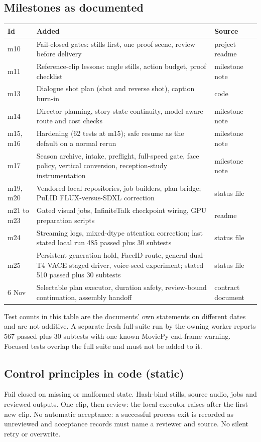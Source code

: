 \documentclass[11pt,a4paper]{article}
\begin{document}
\subsection{Milestones as documented}
\begin{longtable}{@{}P{1.6cm}P{9.9cm}P{4.0cm}@{}}
\toprule \textbf{Id} & \textbf{Added} & \textbf{Source}\\ \midrule\endhead
m10 & Fail-closed gates: stills first, one proof scene, review before delivery & project readme\\
m11 & Reference-clip lessons: angle stills, action budget, proof checklist & milestone note\\
m13 & Dialogue shot plan (shot and reverse shot), caption burn-in & code\\
m14 & Director planning, story-state continuity, model-aware route and cost checks & milestone note\\
m15, m16 & Hardening (62 tests at m15); safe resume as the default on a normal rerun & milestone note\\
m17 & Season archive, intake, preflight, full-speed gate, face policy, vertical conversion, reception-study instrumentation & milestone note\\
m19, m20 & Vendored local repositories, job builders, plan bridge; PuLID FLUX-versus-SDXL correction & status file\\
m21 to m23 & Gated visual jobs, InfiniteTalk checkpoint wiring, GPU preparation scripts & readme\\
m24 & Streaming logs, mixed-dtype attention correction; last stated local run 485 passed plus 30 subtests & status file\\
m25 & Persistent generation hold, FaceID route, general dual-T4 VACE staged driver, voice-seed experiment; stated 510 passed plus 30 subtests & status file\\
6 Nov & Selectable plan executor, duration safety, review-bound continuation, assembly handoff & contract document\\
\bottomrule
\end{longtable}
Test counts in this table are the documents' own statements on different dates and are not additive. A separate fresh full-suite run by the owning worker reports 567 passed plus 30 subtests with one known MoviePy end-frame warning. Focused tests overlap the full suite and must not be added to it.

\subsection{Control principles in code (static)}
Fail closed on missing or malformed state. Hash-bind stills, source audio, jobs and reviewed outputs. One clip, then review: the local executor raises after the first new clip. No automatic acceptance: a successful process exit is recorded as unreviewed and acceptance records must name a reviewer and source. No silent retry or overwrite.
\end{document}
